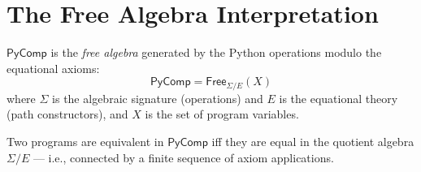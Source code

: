 \section{The Free Algebra Interpretation}

$\mathsf{PyComp}$ is the \emph{free algebra} generated by the Python
operations modulo the equational axioms:
\[
  \mathsf{PyComp} = \mathsf{Free}_{\Sigma/E}(X)
\]
where $\Sigma$ is the algebraic signature (operations) and $E$ is
the equational theory (path constructors), and $X$ is the set of
program variables.

Two programs are equivalent in $\mathsf{PyComp}$ iff they are equal
in the quotient algebra $\Sigma/E$ --- i.e., connected by a finite
sequence of axiom applications.


